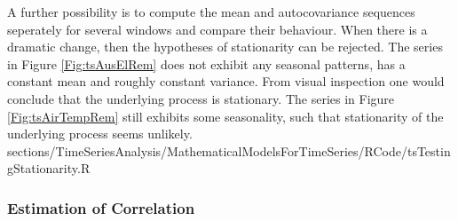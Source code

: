 {{\vfill
\hfill
\break
A further possibility is to compute the mean and autocovariance sequences seperately for several windows and compare their behaviour. When there is a dramatic change, then the hypotheses of stationarity can be rejected.
\vfill
\hfill
\break
The series in Figure \ref{Fig:tsAusElRem} does not exhibit any seasonal patterns, has a constant mean and roughly constant variance. From visual inspection one would conclude that the underlying process is stationary.
\vfill
\hfill
\break
The series in Figure \ref{Fig:tsAirTempRem} still exhibits some seasonality, such that stationarity of the underlying process seems unlikely.
}
{sections/TimeSeriesAnalysis/MathematicalModelsForTimeSeries/RCode/tsTestingStationarity.R}
}
\subsubsection{Estimation of Correlation}
